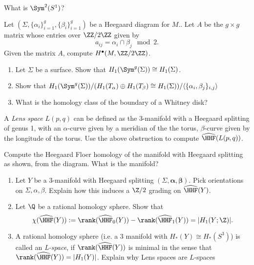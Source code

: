 
\label{art:heegaardFloerExercises}

\begin{exercise}
    \label{exr:sym2s1}
     What is $\Sym^2(S^1)$?
\end{exercise}
\begin{exercise}
    \label{exr:homologyFromHeegaardDiagram}
    Let $(\Sigma, \{\alpha_i\}_{i=1}^g, \{\beta_i\}_{i=1}^g)$ be a Heegaard diagram for $M$.. Let $A$ be the $g\times g$ matrix whose entries over $\ZZ/2\ZZ$ given by  
    \[a_{ij}=\alpha_{i}\cap \beta_j \mod 2.\] 
    Given the matrix $A$, compute $H^\bullet(M, \ZZ/2\ZZ)$.
\end{exercise}
\begin{exercise}
    \label{exr:homologyClassOfWhitneyDisk}
    \begin{enumerate}
            \item    Let $\Sigma$ be a surface. Show that $H_1(\Sym^g(\Sigma))\cong H_1(\Sigma)$.
            \item    Show that $H_1(\Sym^g(\Sigma))/(H_1(T_\alpha)\oplus H_1(T_\beta)\cong H_1(\Sigma))/\langle\{\alpha_i,\beta_j\}_{i,j}\rangle$
             \item   What is the homology class of the boundary of a Whitney disk?
    \end{enumerate}
\end{exercise}    
\begin{exercise}
    \label{exr:heegaardFloerLensSpace}
        A \emph{Lens space} $L(p,q)$ can be defined as the $3$-manifold with a Heegaard splitting of genus 1, with an $\alpha$-curve given by a meridian of the the torus, $\beta$-curve given by the longitude of the torus. Use the above obstruction to compute $\widehat{\HHF}(L(p,q))$.
\end{exercise}
        
\begin{exercise}
\label{exr:heegaardMoves}
Compute the Heegaard Floer homology of the manifold with Heegaard splitting as shown, from the diagram. What is the manifold?

\end{exercise}
\begin{exercise}
     \begin{enumerate}
            \item Let $Y$ be a $3$-manifold with Heegaard splitting $(\Sigma,\mathbf{\alpha},\mathbf{\beta})$. Pick  orientations on $\Sigma,\alpha,\beta$. Explain how this induces a $\Z/2$ grading on $\widehat{\HHF}(Y)$.
            
            \item Let $\Q$ be a rational homology sphere. Show that 
            \[\chi(\widehat{\HHF}(Y)):=\rank(\widehat{\HHF}_0(Y))-\rank(\widehat{\HHF}_1(Y))=|H_1(Y;\Z)|.\]
            
            \item A rational homology sphere (i.e. a 3 manifold with $H_*(Y)\cong H_*(S^3)$) is called an \emph{L-space}, if $\rank(\widehat{\HHF}(Y))$ is minimal in the sense that $\rank(\widehat{\HHF}(Y))=|H_1(Y)|$. Explain why Lens spaces are $L$-spaces
        \end{enumerate}
\end{exercise}

